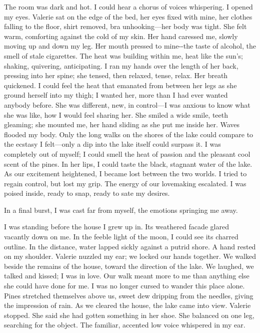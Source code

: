 The room was dark and hot. I could hear a chorus of voices whispering. I
opened my eyes. Valerie sat on the edge of the bed, her eyes fixed with
mine, her clothes falling to the floor, shirt removed, bra
unhooking---her body was tight. She felt warm, comforting against the
cold of my skin. Her hand caressed me, slowly moving up and down my leg.
Her mouth pressed to mine-\/-the taste of alcohol, the smell of stale
cigarettes. The heat was building within me, heat like the sun's;
shaking, quivering, anticipating. I ran my hands over the length of her
back, pressing into her spine; she tensed, then relaxed, tense, relax.
Her breath quickened. I could feel the heat that emanated from between
her legs as she ground herself into my thigh; I wanted her, more than I
had ever wanted anybody before. She was different, new, in control---I
was anxious to know what she was like, how I would feel sharing her. She
smiled a wide smile, teeth gleaming; she mounted me, her hand sliding as
she put me inside her. Waves flooded my body. Only the long walks on the
shores of the lake could compare to the ecstasy I felt---only a dip into
the lake itself could surpass it. I was completely out of myself; I
could smell the heat of passion and the pleasant cool scent of the
pines. In her lips, I could taste the black, stagnant water of the lake.
As our excitement heightened, I became lost between the two worlds. I
tried to regain control, but lost my grip. The energy of our lovemaking
escalated. I was poised inside, ready to snap, ready to sate my desires.

In a final burst, I was cast far from myself, the emotions springing me
away.

I was standing before the house I grew up in. Its weathered facade
glared vacantly down on me. In the feeble light of the moon, I could see
its charred outline. In the distance, water lapped sickly against a
putrid shore. A hand rested on my shoulder. Valerie nuzzled my ear; we
locked our hands together. We walked beside the remains of the house,
toward the direction of the lake. We laughed, we talked and kissed; I
was in love. Our walk meant more to me than anything else she could have
done for me. I was no longer cursed to wander this place alone. Pines
stretched themselves above us, sweet dew dripping from the needles,
giving the impression of rain. As we cleared the house, the lake came
into view. Valerie stopped. She said she had gotten something in her
shoe. She balanced on one leg, searching for the object. The familiar,
accented low voice whispered in my ear.

